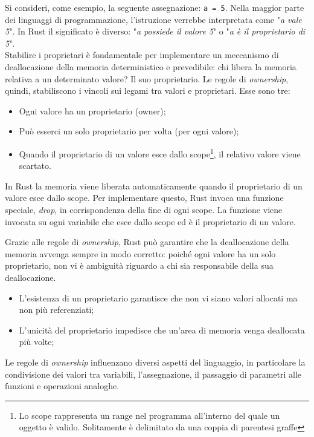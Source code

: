 Si consideri, come esempio, la seguente assegnazione: \texttt{a = 5}.
Nella maggior parte dei linguaggi di programmazione, l'istruzione verrebbe interpretata come "\textit{a vale 5}". In Rust il significato è diverso: "\textit{a possiede il valore 5}" o "\textit{a è il proprietario di 5}". \\
\indent Stabilire i proprietari è fondamentale per implementare un meccanismo di deallocazione della memoria deterministico e prevedibile: chi libera la memoria relativa a un determinato valore? Il suo proprietario. \break \break
\noindent Le regole di \textit{ownership}, quindi, stabiliscono i vincoli sui legami tra valori e proprietari. Esse sono tre:
\begin{itemize}
    \item Ogni valore ha un proprietario (owner);
    \item Può esserci un solo proprietario per volta (per ogni valore);
    \item Quando il proprietario di un valore esce dallo scope\footnote{Lo scope rappresenta un range nel programma all'interno del quale un oggetto è valido. Solitamente è delimitato da una coppia di parentesi graffe}, il relativo valore viene scartato.
\end{itemize}

\noindent In Rust la memoria viene liberata automaticamente quando il proprietario di un valore esce dallo scope. Per implementare questo, Rust invoca una funzione speciale, \textit{drop}, in corrispondenza della fine di ogni scope. La funzione viene invocata su ogni variabile che esce dallo scope ed è il proprietario di un valore.

Grazie alle regole di \textit{ownership}, Rust può garantire che la deallocazione della memoria avvenga sempre in modo corretto: poiché ogni valore ha un solo proprietario, non vi è ambiguità riguardo a chi sia responsabile della sua deallocazione.
\begin{itemize}
    \item L'esistenza di un proprietario garantisce che non vi siano valori allocati ma non più referenziati;
    \item L'unicità del proprietario impedisce che un'area di memoria venga deallocata più volte;
\end{itemize}

\noindent Le regole di \textit{ownership} influenzano diversi aspetti del linguaggio, in particolare la condivisione dei valori tra variabili, l'assegnazione, il passaggio di parametri alle funzioni e operazioni analoghe.

